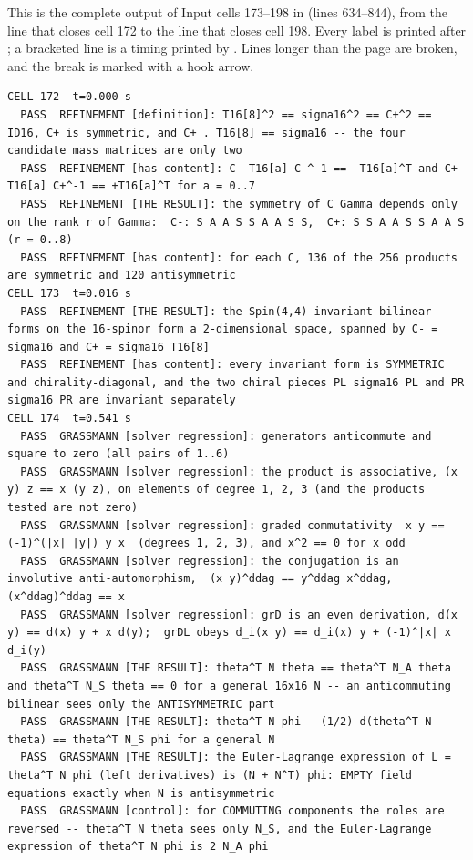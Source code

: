 This is the complete output of Input cells 173--198 in 
(lines 634--844), from the line that closes cell 172 to the line that closes cell 198. Every label is
printed after ; a bracketed \cfcode{[t s]} line is a timing printed by .
Lines longer than the page are broken, and the break is marked with a hook arrow.

\begin{Verbatim}[fontsize=\scriptsize]
CELL 172  t=0.000 s
  PASS  REFINEMENT [definition]: T16[8]^2 == sigma16^2 == C+^2 == ID16, C+ is symmetric, and C+ . T16[8] == sigma16 -- the four candidate mass matrices are only two
  PASS  REFINEMENT [has content]: C- T16[a] C-^-1 == -T16[a]^T and C+ T16[a] C+^-1 == +T16[a]^T for a = 0..7
  PASS  REFINEMENT [THE RESULT]: the symmetry of C Gamma depends only on the rank r of Gamma:  C-: S A A S S A A S S,  C+: S S A A S S A A S  (r = 0..8)
  PASS  REFINEMENT [has content]: for each C, 136 of the 256 products are symmetric and 120 antisymmetric
CELL 173  t=0.016 s
  PASS  REFINEMENT [THE RESULT]: the Spin(4,4)-invariant bilinear forms on the 16-spinor form a 2-dimensional space, spanned by C- = sigma16 and C+ = sigma16 T16[8]
  PASS  REFINEMENT [has content]: every invariant form is SYMMETRIC and chirality-diagonal, and the two chiral pieces PL sigma16 PL and PR sigma16 PR are invariant separately
CELL 174  t=0.541 s
  PASS  GRASSMANN [solver regression]: generators anticommute and square to zero (all pairs of 1..6)
  PASS  GRASSMANN [solver regression]: the product is associative, (x y) z == x (y z), on elements of degree 1, 2, 3 (and the products tested are not zero)
  PASS  GRASSMANN [solver regression]: graded commutativity  x y == (-1)^(|x| |y|) y x  (degrees 1, 2, 3), and x^2 == 0 for x odd
  PASS  GRASSMANN [solver regression]: the conjugation is an involutive anti-automorphism,  (x y)^ddag == y^ddag x^ddag,  (x^ddag)^ddag == x
  PASS  GRASSMANN [solver regression]: grD is an even derivation, d(x y) == d(x) y + x d(y);  grDL obeys d_i(x y) == d_i(x) y + (-1)^|x| x d_i(y)
  PASS  GRASSMANN [THE RESULT]: theta^T N theta == theta^T N_A theta and theta^T N_S theta == 0 for a general 16x16 N -- an anticommuting bilinear sees only the ANTISYMMETRIC part
  PASS  GRASSMANN [THE RESULT]: theta^T N phi - (1/2) d(theta^T N theta) == theta^T N_S phi for a general N
  PASS  GRASSMANN [THE RESULT]: the Euler-Lagrange expression of L = theta^T N phi (left derivatives) is (N + N^T) phi: EMPTY field equations exactly when N is antisymmetric
  PASS  GRASSMANN [control]: for COMMUTING components the roles are reversed -- theta^T N theta sees only N_S, and the Euler-Lagrange expression of theta^T N phi is 2 N_A phi

\end{Verbatim}
